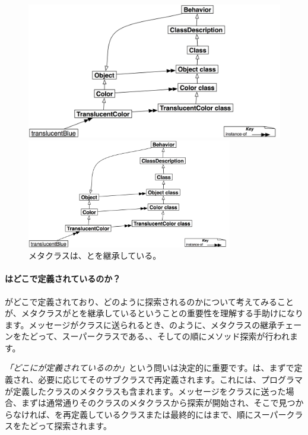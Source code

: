 \documentclass[a4paper,10pt,twoside]{book}
\begin{document}
\begin{center}
\begin{figure}
\ifluluelse
	{\centerline{\includegraphics[width=\textwidth]{TranslucentBehavior}}}
	{\centerline{\includegraphics[width=0.8\textwidth]{TranslucentBehavior}}}
\caption{メタクラスは、とを継承している。}
\end{figure}
\end{center}

\paragraph{はどこで定義されているのか？}
がどこで定義されており、どのように探索されるのかについて考えてみることが、メタクラスがとを継承しているということの重要性を理解する手助けになります。メッセージがクラスに送られるとき、のように、メタクラスの継承チェーンをたどって、スーパークラスである、、そしての順にメソッド探索が行われます。

\emph{「どこにが定義されているのか」}という問いは決定的に重要です。は、まずで定義され、必要に応じてそのサブクラスで再定義されます。これには、プログラマが定義したクラスのメタクラスも含まれます。メッセージをクラスに送った場合、まずは通常通りそのクラスのメタクラスから探索が開始され、そこで見つからなければ、を再定義しているクラスまたは最終的にはまで、順にスーパークラスをたどって探索されます。
\end{document}
